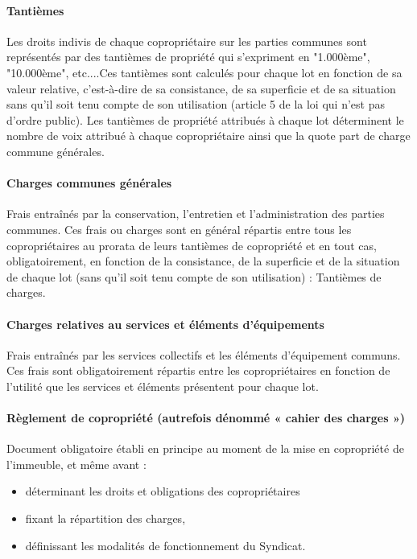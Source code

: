 	\paragraph*{Tantièmes}
	Les droits indivis de chaque copropriétaire sur les parties communes sont représentés par des tantièmes de propriété qui s'expriment en "1.000ème", "10.000ème", etc....Ces tantièmes sont calculés pour chaque lot en fonction de sa valeur relative, c’est-à-dire de sa consistance, de sa superficie et de sa situation sans qu'il soit tenu compte de son utilisation (article 5 de la loi qui n'est pas d'ordre public).
	Les tantièmes de propriété attribués à chaque lot déterminent le nombre de voix attribué à chaque copropriétaire ainsi que la quote part de charge commune générales.
	
	\paragraph*{Charges communes générales}
	Frais entraînés par la conservation, l'entretien et l'administration des parties communes.
	Ces frais ou charges sont en général répartis entre tous les copropriétaires au prorata de leurs tantièmes de copropriété et en tout cas, obligatoirement, en fonction de la consistance, de la superficie et de la situation de chaque lot (sans qu'il soit tenu compte de son utilisation) : Tantièmes de charges.
	
	\paragraph*{Charges relatives au services et éléments d’équipements}
	Frais entraînés par les services collectifs et les éléments d'équipement communs.
	Ces frais sont obligatoirement répartis entre les copropriétaires en fonction de l'utilité que les services et éléments présentent pour chaque lot.
	
	\paragraph*{Règlement de copropriété (autrefois dénommé « cahier des charges »)}
	Document obligatoire établi en principe au moment de la mise en copropriété de l'immeuble, et même avant :
	\begin{itemize}
		\item déterminant les droits et obligations des copropriétaires
		\item  fixant la répartition des charges,
		\item  définissant les modalités de fonctionnement du Syndicat.
	\end{itemize}
	

